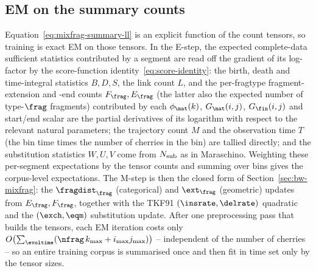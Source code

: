 \subsection{EM on the summary counts}
\label{sec:mixfrag-summary-em}

Equation~\eqref{eq:mixfrag-summary-ll} is an explicit function of the count
tensors, so training is exact EM on those tensors.
In the E-step, the expected complete-data sufficient statistics contributed by a
segment are read off the gradient of its log-factor by the score-function
identity~\eqref{eq:score-identity}: the birth, death and time-integral statistics
$B,D,S$, the link count $L$, and the per-fragtype fragment-extension and -end
counts $F_\frag,E_\frag$ (the latter also the expected number of type-$\frag$
fragments) contributed by each $\runfac_\mat(k)$, $G_\mat(i,j)$, $G_\fin(i,j)$ and
start/end scalar are the partial derivatives of its logarithm with respect to the
relevant natural parameters; the trajectory count $M$ and the observation time $T$
(the bin time times the number of cherries in the bin) are tallied directly; and
the substitution statistics $W,U,V$ come from $N_{\mathrm{sub}}$ as in Maraschino.
Weighting these per-segment expectations by the tensor counts and summing over
bins gives the corpus-level expectations.
The M-step is then the closed form of Section~\ref{sec:bw-mixfrag}: the
$\fragdist_\frag$ (categorical) and $\ext_\frag$ (geometric) updates from
$E_\frag,F_\frag$, together with the TKF91 $(\insrate,\delrate)$ quadratic and the
$(\exch,\eqm)$ substitution update.
After one preprocessing pass that builds the tensors, each EM iteration costs only
$O\bigl(\sum_\evoltime(\nfrag\,k_{\max}+i_{\max}j_{\max})\bigr)$ -- independent of
the number of cherries -- so an entire training corpus is summarised once and then
fit in time set only by the tensor sizes.
